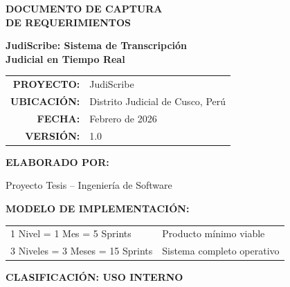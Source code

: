 \documentclass[12pt,a4paper]{report}
\begin{document}
\begin{titlepage}
    \centering
    \vspace*{1.5cm}

    {\Huge\bfseries\color{primaryblue} DOCUMENTO DE CAPTURA\\[0.3cm] DE REQUERIMIENTOS\par}
    \vspace{1.5cm}

    {\LARGE\bfseries JudiScribe: Sistema de Transcripción\\[0.2cm] Judicial en Tiempo Real\par}
    \vspace{2.5cm}

    \begin{tabular}{rl}
        \textbf{PROYECTO:} & JudiScribe \\[0.3cm]
        \textbf{UBICACIÓN:} & Distrito Judicial de Cusco, Perú \\[0.3cm]
        \textbf{FECHA:} & Febrero de 2026 \\[0.3cm]
        \textbf{VERSIÓN:} & 1.0 \\[0.3cm]
    \end{tabular}

    \vspace{2.5cm}

    {\large\textbf{ELABORADO POR:}\par}
    \vspace{0.5cm}
    {\large Proyecto Tesis -- Ingeniería de Software\par}

    \vspace{2cm}

    {\large\textbf{MODELO DE IMPLEMENTACIÓN:}\par}
    \vspace{0.5cm}

    \begin{tabular}{ll}
        1 Nivel = 1 Mes = 5 Sprints & Producto mínimo viable \\
        3 Niveles = 3 Meses = 15 Sprints & Sistema completo operativo \\
    \end{tabular}

    \vfill

    {\large\textbf{\color{warningred} CLASIFICACIÓN: USO INTERNO}\par}

\end{titlepage}
\end{document}
